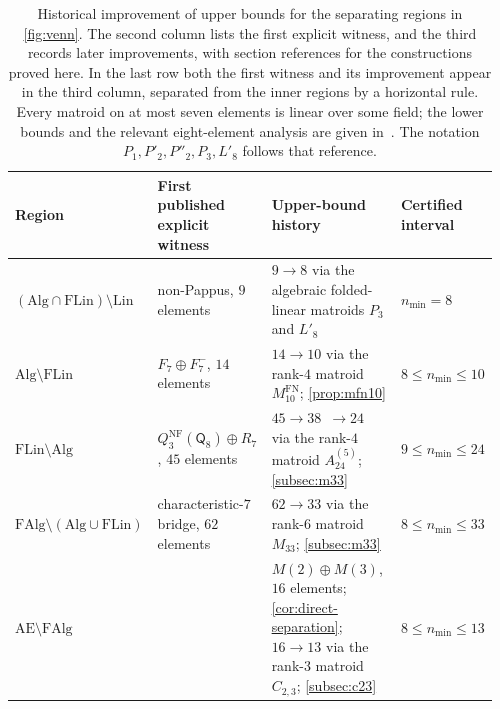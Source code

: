 \documentclass[11pt]{article}
\theoremstyle{definition}
\newcommand{\FAlg}{\mathrm{FAlg}}
\newcommand{\FLin}{\mathrm{FLin}}
\newcommand{\Alg}{\mathrm{Alg}}
\newcommand{\Lin}{\mathrm{Lin}}
\newcommand{\AlmostEnt}{\mathrm{AE}}
\begin{document}
\begin{table}[t]
\centering
\caption{Historical improvement of upper bounds for the separating regions in \cref{fig:venn}.  The second column lists the first explicit witness, and the third records later improvements, with section references for the constructions proved here.  In the last row both the first witness and its improvement appear in the third column, separated from the inner regions by a horizontal rule.  Every matroid on at most seven elements is linear over some field; the lower bounds and the relevant eight-element analysis are given in~\cite{BamiloshinEtAl2021}.  The notation $P_1,P'_2,P''_2,P_3,L'_8$ follows that reference.}
\label{tab:witness-sizes}
\begingroup
\scriptsize
\setlength{\tabcolsep}{2.6pt}
\renewcommand{\arraystretch}{1.16}
\begin{tabular}{@{}>{\raggedright\arraybackslash}p{0.205\linewidth}>{\raggedright\arraybackslash}p{0.245\linewidth}>{\raggedright\arraybackslash}p{0.34\linewidth}>{\centering\arraybackslash}p{0.17\linewidth}@{}}
\toprule
Region & First published explicit witness & Upper-bound history & Certified interval\\
\midrule
$(\Alg\cap\FLin)\setminus\Lin$
 & non-Pappus, $9$ elements~\cite{LindstromNonPappus1986,PendavinghVanZwam2013}
 & $9\to8$ via the algebraic folded-linear matroids $P_3$ and $L'_8$~\cite[Propositions~4.1 and~4.5]{BamiloshinEtAl2021}
 & $n_{\min}=8$\\
$\Alg\setminus\FLin$
 & $F_7\oplus F_7^-$, $14$ elements~\cite{Ingleton1971,Matus1999}
 & $14\to10$ via the rank-$4$ matroid $M^{\mathrm{FN}}_{10}$; \cref{prop:mfn10}
 & $8\le n_{\min}\le10$\\
$\FLin\setminus\Alg$
 & $Q^{\mathrm{NF}}_3(\mathsf Q_8)\oplus R_7$, $45$ elements~\cite{BenEfraim2016}
 & $45\to38$~\cite[Remark~2]{BenEfraim2016}$\to24$ via the rank-$4$ matroid $A_{24}^{(5)}$; \cref{subsec:m33}
 & $9\le n_{\min}\le24$\\
$\FAlg\setminus(\Alg\cup\FLin)$
 & characteristic-$7$ bridge, $62$ elements~\cite{BenEfraim2016,SharififarEtAl2024}
 & $62\to33$ via the rank-$6$ matroid $M_{33}$; \cref{subsec:m33}
 & $8\le n_{\min}\le33$\\
\midrule
$\AlmostEnt\setminus\FAlg$
 &
 & $M(2)\oplus M(3)$, $16$ elements; \cref{cor:direct-separation}; $16\to13$ via the rank-$3$ matroid $C_{2,3}$; \cref{subsec:c23}
 & $8\le n_{\min}\le13$\\
\bottomrule
\end{tabular}
\endgroup
\end{table}
\end{document}
